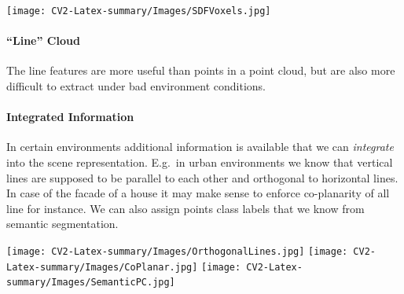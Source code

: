 \documentclass[oneside,fontsize=11pt,paper=a4]{scrartcl}
\begin{document}
\begin{multicols}{2}
\texttt{[image: CV2-Latex-summary/Images/SDFVoxels.jpg]}

\paragraph{``Line'' Cloud} The line features are more useful than points in a point cloud, but are also more difficult to extract under bad environment conditions. 

\paragraph{Integrated Information} In certain environments  additional information is available that we can \textit{integrate} into the scene representation. E.g.\ in urban environments we know that vertical lines are supposed to be parallel to each other and orthogonal to horizontal lines. In case of the facade of a house it may make sense to enforce co-planarity of all line for instance. We can also assign points class labels that we know from semantic segmentation.

\setlength{\columnsep}{0cm}
\begin{multicols}{3}
    \texttt{[image: CV2-Latex-summary/Images/OrthogonalLines.jpg]}
    \texttt{[image: CV2-Latex-summary/Images/CoPlanar.jpg]}
    \texttt{[image: CV2-Latex-summary/Images/SemanticPC.jpg]}
\end{multicols}

\end{multicols}

\newpage


\end{document}
